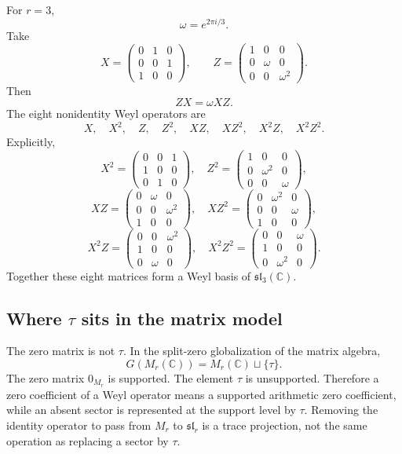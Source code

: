 \documentclass[11pt]{article}
\newcommand{\CC}{\mathbb C}
\begin{document}
For $r=3$,
\[
        \omega=e^{2\pi i/3}.
\]
Take
\[
        X=\begin{pmatrix}
        0&1&0\\
        0&0&1\\
        1&0&0
        \end{pmatrix},
        \qquad
        Z=\begin{pmatrix}
        1&0&0\\
        0&\omega&0\\
        0&0&\omega^2
        \end{pmatrix}.
\]
Then
\[
        ZX=\omega XZ.
\]
The eight nonidentity Weyl operators are
\[
        X,\quad X^2,
        \quad Z,
        \quad Z^2,
        \quad XZ,
        \quad XZ^2,
        \quad X^2Z,
        \quad X^2Z^2.
\]
Explicitly,
\[
X^2=\begin{pmatrix}
0&0&1\\
1&0&0\\
0&1&0
\end{pmatrix},
\quad
Z^2=\begin{pmatrix}
1&0&0\\
0&\omega^2&0\\
0&0&\omega
\end{pmatrix},
\]
\[
XZ=\begin{pmatrix}
0&\omega&0\\
0&0&\omega^2\\
1&0&0
\end{pmatrix},
\quad
XZ^2=\begin{pmatrix}
0&\omega^2&0\\
0&0&\omega\\
1&0&0
\end{pmatrix},
\]
\[
X^2Z=\begin{pmatrix}
0&0&\omega^2\\
1&0&0\\
0&\omega&0
\end{pmatrix},
\quad
X^2Z^2=\begin{pmatrix}
0&0&\omega\\
1&0&0\\
0&\omega^2&0
\end{pmatrix}.
\]
Together these eight matrices form a Weyl basis of $\mathfrak{sl}_3(\CC)$.

\subsection{Where $\tau$ sits in the matrix model}

The zero matrix is not $\tau$.  In the split-zero globalization of the matrix algebra,
\[
        G(M_r(\CC))=M_r(\CC)\sqcup\{\tau\}.
\]
The zero matrix $0_{M_r}$ is supported.  The element $\tau$ is unsupported.  Therefore a zero coefficient of a Weyl operator means a supported arithmetic zero coefficient, while an absent sector is represented at the support level by $\tau$.  Removing the identity operator to pass from $M_r$ to $\mathfrak{sl}_r$ is a trace projection, not the same operation as replacing a sector by $\tau$.
\end{document}
